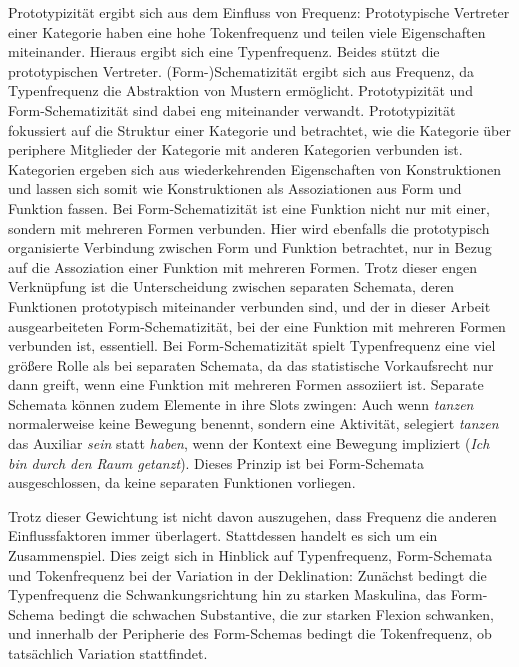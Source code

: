  

Prototypizität ergibt sich aus dem Einfluss von Frequenz: Prototypische Vertreter einer Kategorie haben eine hohe Tokenfrequenz und teilen viele Eigenschaften miteinander. Hieraus ergibt sich eine Typenfrequenz. Beides stützt die prototypischen Vertreter. (Form-)Sche\-ma\-ti\-zi\-tät ergibt sich aus Frequenz, da Typenfrequenz die Abstraktion von Mustern ermöglicht. Prototypizität und Form-Schematizität sind dabei eng miteinander verwandt. Prototypizität fokussiert auf die Struktur einer Kategorie und betrachtet, wie die Kategorie über periphere Mitglieder der Kategorie mit anderen Kategorien verbunden ist. Kategorien ergeben sich aus wiederkehrenden Eigenschaften von Konstruktionen und lassen sich somit wie Konstruktionen als Assoziationen aus Form und Funktion fassen. Bei Form-Schematizität ist eine Funktion nicht nur mit einer, sondern mit mehreren Formen verbunden. Hier wird ebenfalls die prototypisch organisierte Verbindung zwischen Form und Funktion betrachtet, nur in Bezug auf die Assoziation einer Funktion mit mehreren Formen. Trotz dieser engen Verknüpfung ist die Unterscheidung zwischen separaten Schemata, deren Funktionen prototypisch miteinander verbunden sind, und der in dieser Arbeit ausgearbeiteten Form-Schematizität, bei der eine Funktion mit mehreren Formen verbunden ist, essentiell. Bei Form-Schematizität spielt Typenfrequenz eine viel größere Rolle als bei separaten Schemata, da das statistische Vorkaufsrecht nur dann greift, wenn eine Funktion mit mehreren Formen assoziiert ist. Separate Schemata können zudem Elemente in ihre Slots zwingen: Auch wenn \textit{tanzen} normalerweise keine Bewegung benennt, sondern eine Aktivität, selegiert \textit{tanzen} das Auxiliar \textit{sein} statt \textit{haben}, wenn der Kontext eine Bewegung impliziert (\textit{Ich bin durch den Raum getanzt}). Dieses Prinzip ist bei Form-Schemata ausgeschlossen, da keine separaten Funktionen vorliegen.   


Trotz dieser Gewichtung ist nicht davon auszugehen, dass Frequenz die anderen Einflussfaktoren immer überlagert. Stattdessen handelt es sich um ein Zusammenspiel. Dies zeigt sich in Hinblick auf Typenfrequenz, Form-Schemata und Tokenfrequenz bei der Variation in der Deklination: Zunächst bedingt die Typenfrequenz die Schwankungsrichtung hin zu starken Maskulina, das Form-Schema bedingt die schwachen Substantive, die zur starken Flexion schwanken, und innerhalb der Peripherie des Form-Schemas bedingt die Tokenfrequenz, ob tatsächlich Variation stattfindet.  

